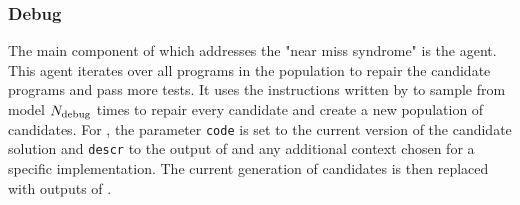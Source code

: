 \begin{comment}
We consider two different designs of the instruction generation block: \instructs{} and \instructllm{} shown in figure~\ref{fig:method-instruct}. 
Both types of blocks use failing I/O pairs from the validation set and \texttt{stderr} output of the candidate execution. 
In both blocks, if \texttt{stderr} is not empty, i.e., execution errors occur before getting the output to compare it with the expected output, the \texttt{stderr}-based template engine generates an instruction to fix the error mentioned in \texttt{stderr}. 
However, the blocks differ in the way they transform failing I/O pairs to generate instructions in case \texttt{stderr} is empty.

\instructs{} uses a fixed input template and substitutes placeholders for input and output with the corresponding strings of the first failing test case.
We show the resulting instruction for an exemplar template in figure~\ref{fig:method-instruct}.
By contrast, \instructllm{} uses the failing I/O pair in the LLM for text completion, thereby prompting the text LLM to produce the bug summary. 
An exemplar output of the code behavior template engine in figure~\ref{fig:method-instruct} describes that the code returns output O instead of expected output O$_{\text{val}}$ for the failing test case with input string I$_{\text{val}}.$
The LLM is then prompted to auto-complete this description of program behavior with the bug summary. 
The bug description is passed further to the next template engine and used as the debugging instruction, such as ``\emph{Fix~\{bug summary\}}''.
\end{comment}

\subsubsection{Debug}

The main component of \method{} which addresses the "near miss syndrome" is the \debug{} agent.  
This agent iterates over all programs in the population to repair the candidate programs and pass more tests. 
It uses the instructions written by \instruct{} to sample from \debugmodel{} model $N_\text{debug}{}$ times
to repair every candidate and create a new population of \treearity{} candidates.
For \debugmodel{}, the parameter \texttt{code} is set to the current version of the candidate solution and \texttt{descr} to the output of \instruct{} and any additional context chosen for a specific implementation.
The current generation of candidates is then replaced with \treearity{} outputs of \debug{}.

